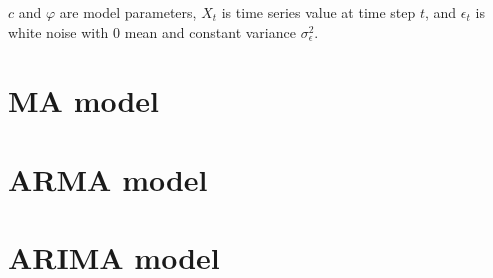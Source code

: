 $c$ and $\varphi$ are model parameters, $X_t$ is time series value at time step $t$, and $\epsilon_t$ is white noise with 0 mean and constant variance $\sigma_{\epsilon}^2$.

\section{MA model}
\label{sec:MA model}

\section{ARMA model}
\label{sec:ARMA model}

\section{ARIMA model}
\label{sec:ARIMA model}
